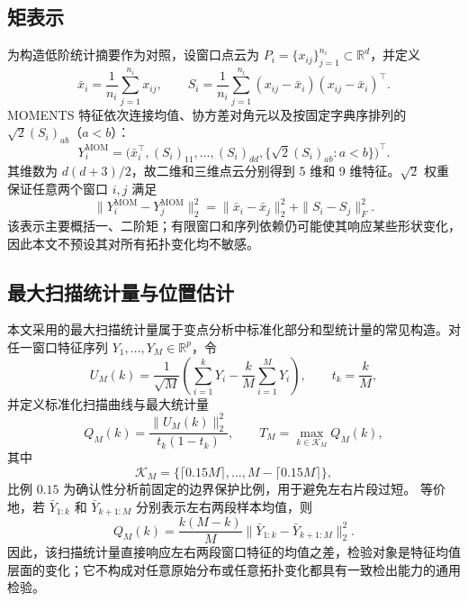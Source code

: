 \subsection{矩表示}\label{sec:moments}

为构造低阶统计摘要作为对照，设窗口点云为 $P_i=\{x_{ij}\}_{j=1}^{n_i}\subset\mathbb R^d$，并定义
\begin{equation}\label{eq:moments}
 \bar x_i=\frac1{n_i}\sum_{j=1}^{n_i}x_{ij},\qquad
 S_i=\frac1{n_i}\sum_{j=1}^{n_i}(x_{ij}-\bar x_i)(x_{ij}-\bar x_i)^\top.
\end{equation}
MOMENTS 特征依次连接均值、协方差对角元以及按固定字典序排列的 $\sqrt2(S_i)_{ab}$（$a<b$）：
\begin{equation}\label{eq:moments-vector}
 Y_i^{\mathrm{MOM}}
 =\bigl(\bar x_i^\top,(S_i)_{11},\ldots,(S_i)_{dd},
 \{\sqrt2(S_i)_{ab}:a<b\}\bigr)^\top.
\end{equation}
其维数为 $d(d+3)/2$，故二维和三维点云分别得到 5 维和 9 维特征。$\sqrt2$ 权重保证任意两个窗口 $i,j$ 满足
\begin{equation}\label{eq:moments-frob}
 \|Y_i^{\mathrm{MOM}}-Y_j^{\mathrm{MOM}}\|_2^2
 =\|\bar x_i-\bar x_j\|_2^2+\|S_i-S_j\|_F^2.
\end{equation}
该表示主要概括一、二阶矩；有限窗口和序列依赖仍可能使其响应某些形状变化，因此本文不预设其对所有拓扑变化均不敏感。

\subsection{最大扫描统计量与位置估计}\label{sec:scan}

本文采用的最大扫描统计量属于变点分析中标准化部分和型统计量的常见构造\cite{CsorgoHorvath1997}。对任一窗口特征序列 $Y_1,\ldots,Y_M\in\mathbb R^p$，令
\begin{equation}\label{eq:bridge}
 U_M(k)=\frac1{\sqrt M}
 \left(\sum_{i=1}^kY_i-\frac{k}{M}\sum_{i=1}^M Y_i\right),
 \qquad t_k=\frac{k}{M},
\end{equation}
并定义标准化扫描曲线与最大统计量
\begin{equation}\label{eq:scan}
 Q_M(k)=\frac{\|U_M(k)\|_2^2}{t_k(1-t_k)},\qquad
 T_M=\max_{k\in\mathcal K_M}Q_M(k),
\end{equation}
其中
\[
 \mathcal K_M=\{\lceil0.15M\rceil,\ldots,M-\lceil0.15M\rceil\},
\]
比例 $0.15$ 为确认性分析前固定的边界保护比例，用于避免左右片段过短。
等价地，若 $\bar Y_{1:k}$ 和 $\bar Y_{k+1:M}$ 分别表示左右两段样本均值，则
\begin{equation}\label{eq:scan-equivalent}
 Q_M(k)=\frac{k(M-k)}{M}
 \|\bar Y_{1:k}-\bar Y_{k+1:M}\|_2^2.
\end{equation}
因此，该扫描统计量直接响应左右两段窗口特征的均值之差，检验对象是特征均值层面的变化；它不构成对任意原始分布或任意拓扑变化都具有一致检出能力的通用检验。


